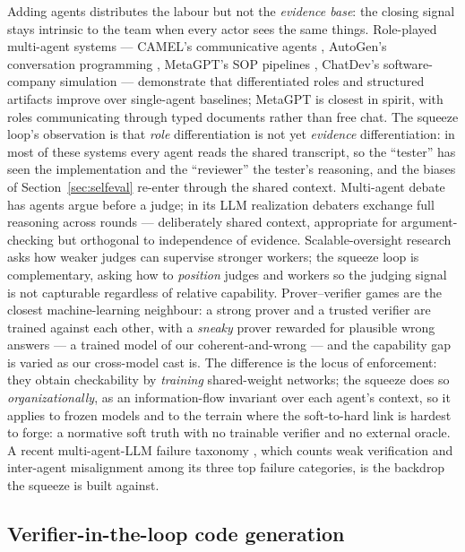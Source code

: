 \documentclass[11pt]{article}
\begin{document}
Adding agents distributes the labour but not the \emph{evidence base}: the closing signal stays
intrinsic to the team when every actor sees the same things. Role-played multi-agent systems ---
CAMEL's communicative agents \citep{li2023camel}, AutoGen's conversation programming
\citep{wu2023autogen}, MetaGPT's SOP pipelines \citep{hong2023metagpt}, ChatDev's
software-company simulation \citep{qian2023chatdev} --- demonstrate that differentiated roles and
structured artifacts improve over single-agent baselines; MetaGPT is closest in spirit, with
roles communicating through typed documents rather than free chat. The squeeze loop's
observation is that \emph{role} differentiation is not yet \emph{evidence} differentiation: in
most of these systems every agent reads the shared transcript, so the ``tester'' has seen the
implementation and the ``reviewer'' the tester's reasoning, and the biases of
Section~\ref{sec:selfeval} re-enter through the shared context. Multi-agent debate
\citep{irving2018debate,du2023debate} has agents argue before a judge; in its LLM realization
\citep{du2023debate} debaters exchange full reasoning across rounds --- deliberately shared
context, appropriate for argument-checking but orthogonal to independence of evidence.
Scalable-oversight research \citep{bowman2022scalable,burns2023weak} asks how weaker judges can
supervise stronger workers; the squeeze loop is complementary, asking how to \emph{position}
judges and workers so the judging signal is not capturable regardless of relative capability.
Prover--verifier games \citep{anil2021pvg,kirchner2024pvg} are the closest machine-learning
neighbour: a strong prover and a trusted verifier are trained against each other, with a \emph{sneaky} prover
rewarded for plausible wrong answers \citep{kirchner2024pvg} --- a trained model of our coherent-and-wrong --- and the
capability gap is varied as our cross-model cast is. The difference is the locus of enforcement:
they obtain checkability by \emph{training} shared-weight networks; the squeeze does so
\emph{organizationally}, as an information-flow invariant over each agent's context, so it
applies to frozen models and to the terrain where the soft-to-hard link is hardest to forge: a
normative soft truth with no trainable verifier and no external oracle. A recent multi-agent-{LLM} failure taxonomy \citep{cemri2025why}, which counts weak
verification and inter-agent misalignment among its three top failure categories, is the backdrop the
squeeze is built against.

\subsection{Verifier-in-the-loop code generation}
\end{document}
